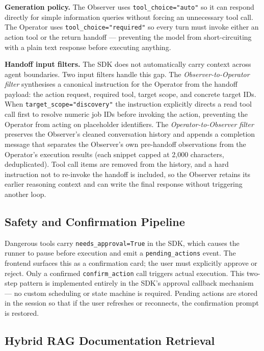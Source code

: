 \textbf{Generation policy.} The Observer uses \texttt{tool\_choice="auto"} so it can respond directly for simple information queries without forcing an unnecessary tool call. The Operator uses \texttt{tool\_choice="required"} so every turn must invoke either an action tool or the return handoff — preventing the model from short-circuiting with a plain text response before executing anything.

\textbf{Handoff input filters.} The SDK does not automatically carry context across agent boundaries. Two input filters handle this gap. The \emph{Observer-to-Operator filter} synthesises a canonical instruction for the Operator from the handoff payload: the action request, required tool, target scope, and concrete target IDs. When \texttt{target\_scope="discovery"} the instruction explicitly directs a read tool call first to resolve numeric job IDs before invoking the action, preventing the Operator from acting on placeholder identifiers. The \emph{Operator-to-Observer filter} preserves the Observer's cleaned conversation history and appends a completion message that separates the Observer's own pre-handoff observations from the Operator's execution results (each snippet capped at 2,000 characters, deduplicated). Tool call items are removed from the history, and a hard instruction not to re-invoke the handoff is included, so the Observer retains its earlier reasoning context and can write the final response without triggering another loop.

\subsection{Safety and Confirmation Pipeline}

Dangerous tools carry \texttt{needs\_approval=True} in the SDK, which causes the runner to pause before execution and emit a \texttt{pending\_actions} event. The frontend surfaces this as a confirmation card; the user must explicitly approve or reject. Only a confirmed \texttt{confirm\_action} call triggers actual execution. This two-step pattern is implemented entirely in the SDK's approval callback mechanism — no custom scheduling or state machine is required. Pending actions are stored in the session so that if the user refreshes or reconnects, the confirmation prompt is restored.

\subsection{Hybrid RAG Documentation Retrieval}
\label{sec:impl-rag}


